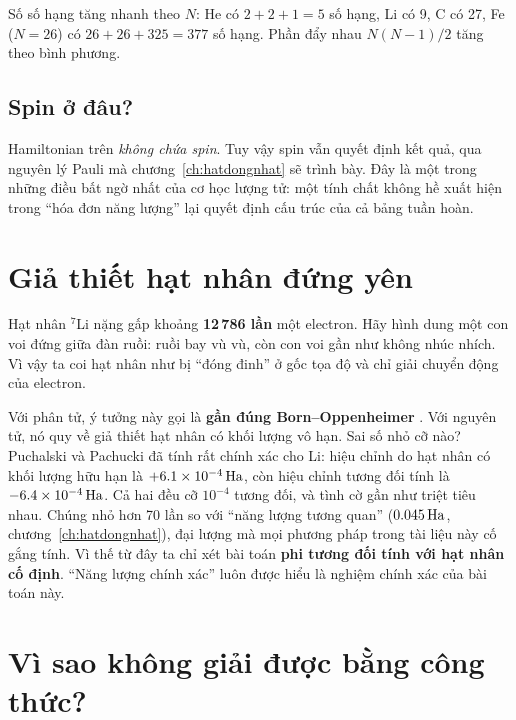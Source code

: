 Số số hạng tăng nhanh theo $N$: He có $2+2+1=5$ số hạng, Li có 9, C có 27, Fe ($N=26$) có $26+26+325=377$ số hạng. Phần đẩy nhau $N(N-1)/2$ tăng theo bình phương.

\subsection{Spin ở đâu?}
Hamiltonian trên \emph{không chứa spin}. Tuy vậy spin vẫn quyết định kết quả, qua nguyên lý Pauli mà chương~\ref{ch:hatdongnhat} sẽ trình bày. Đây là một trong những điều bất ngờ nhất của cơ học lượng tử: một tính chất không hề xuất hiện trong ``hóa đơn năng lượng'' lại quyết định cấu trúc của cả bảng tuần hoàn.

\section{Giả thiết hạt nhân đứng yên}

\begin{eli5}
Hạt nhân $^7$Li nặng gấp khoảng \textbf{12\,786 lần} một electron. Hãy hình dung một con voi đứng giữa đàn ruồi: ruồi bay vù vù, còn con voi gần như không nhúc nhích. Vì vậy ta coi hạt nhân như bị ``đóng đinh'' ở gốc tọa độ và chỉ giải chuyển động của electron.
\end{eli5}

Với phân tử, ý tưởng này gọi là \textbf{gần đúng Born--Oppenheimer} \cite{BornOppenheimer1927}. Với nguyên tử, nó quy về giả thiết hạt nhân có khối lượng vô hạn. Sai số nhỏ cỡ nào? Puchalski và Pachucki \cite{PP2008} đã tính rất chính xác cho Li: hiệu chỉnh do hạt nhân có khối lượng hữu hạn là $+6.1\times10^{-4}\,\mathrm{Ha}$, còn hiệu chỉnh tương đối tính là $-6.4\times10^{-4}\,\mathrm{Ha}$. Cả hai đều cỡ $10^{-4}$ tương đối, và tình cờ gần như triệt tiêu nhau. Chúng nhỏ hơn 70 lần so với ``năng lượng tương quan'' ($0.045\,\mathrm{Ha}$, chương~\ref{ch:hatdongnhat}), đại lượng mà mọi phương pháp trong tài liệu này cố gắng tính. Vì thế từ đây ta chỉ xét bài toán \textbf{phi tương đối tính với hạt nhân cố định}. ``Năng lượng chính xác'' luôn được hiểu là nghiệm chính xác của bài toán này.

\section{Vì sao không giải được bằng công thức?}

